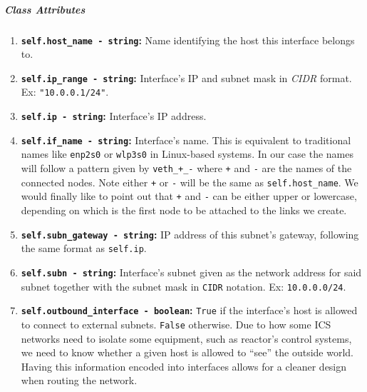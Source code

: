         \subparagraph{Class Attributes}
            \begin{enumerate}
                \item \textbf{\texttt{self.host\_name - string}:} Name identifying the host this interface belongs to.
                \item \textbf{\texttt{self.ip\_range - string}:} Interface's IP and subnet mask in \textit{CIDR} \cite{bib:cidr-notation} format. Ex: \texttt{"10.0.0.1/24"}.
                \item \textbf{\texttt{self.ip - string}:} Interface's IP address.
                \item \textbf{\texttt{self.if\_name - string}:} Interface's name. This is equivalent to traditional names like \texttt{enp2s0} or \texttt{wlp3s0} in Linux-based systems. In our case the names will follow a pattern given by \texttt{veth\_+\_-} where \texttt{+} and \texttt{-} are the names of the connected nodes. Note either \texttt{+} or \texttt{-} will be the same as \texttt{self.host\_name}. We would finally like to point out that \texttt{+} and \texttt{-} can be either upper or lowercase, depending on which is the first node to be attached to the links we create.
                \item \textbf{\texttt{self.subn\_gateway - string}:} IP address of this subnet's gateway, following the same format as \texttt{self.ip}.
                \item \textbf{\texttt{self.subn - string}:} Interface's subnet given as the network address for said subnet together with the subnet mask in \texttt{CIDR} notation. Ex: \texttt{10.0.0.0/24}.
                \item \textbf{\texttt{self.outbound\_interface - boolean}:} \texttt{True} if the interface's host is allowed to connect to external subnets. \texttt{False} otherwise. Due to how some ICS networks need to isolate some equipment, such as reactor's control systems, we need to know whether a given host is allowed to ``see'' the outside world. Having this information encoded into interfaces allows for a cleaner design when routing the network.
            \end{enumerate}

